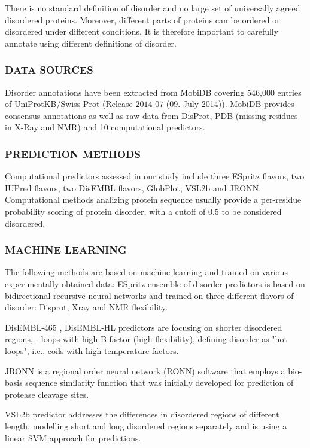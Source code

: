 \documentclass[a4,center,fleqn]{NAR}
\begin{document}
There is no standard definition of disorder and no large set of universally agreed disordered proteins. Moreover, different parts of proteins can be ordered or disordered under different conditions. It is therefore important to carefully annotate using different definitions of disorder.

\subsubsection{\MakeUppercase{Data sources}}
Disorder annotations have been extracted from MobiDB covering 546,000 entries of UniProtKB/Swiss-Prot (Release $2014\_07$ (09. July 2014)).
MobiDB provides consensus annotations as well as raw data from DisProt, PDB (missing residues in X-Ray and NMR) and 10 computational predictors.

\subsubsection{\MakeUppercase{Prediction methods}}
Computational predictors assessed in our study include three ESpritz flavors, two IUPred flavors, two DisEMBL flavors, GlobPlot, VSL2b and JRONN. Computational methods analizing protein sequence usually provide a per-residue probability scoring of protein disorder, with a cutoff of 0.5 to be considered disordered.

\subsubsection{\MakeUppercase{Machine learning}}
The following methods are based on machine learning and trained on various experimentally obtained data:
ESpritz ensemble of disorder predictors is based on bidirectional recursive neural networks and trained on three different flavors of disorder: Disprot, Xray and NMR flexibility.

DisEMBL-465 , DisEMBL-HL predictors are focusing on shorter disordered regions, - loops with high B-factor (high flexibility), defining disorder as "hot loops", i.e., coils with high temperature factors.

JRONN is a regional order neural network (RONN) software that employs a bio-basis sequence similarity function that was initially developed for prediction of protease cleavage sites.

VSL2b predictor addresses the differences in disordered regions of different length, modelling short and long disordered regions separately and is using a linear SVM approach for predictions.
\end{document}
